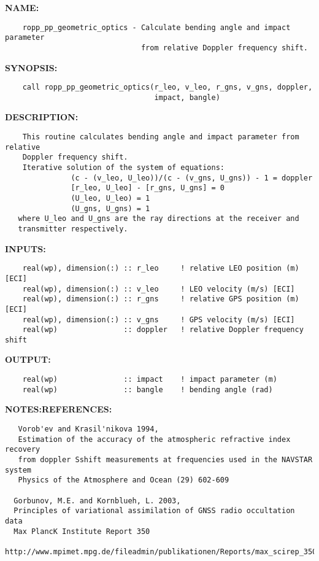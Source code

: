 \label{ch:robo19}
\label{ch:GeometricOptics_ropp_pp_geometric_optics}
\textbf{NAME:}\hspace{0.08in}\begin{Verbatim}
    ropp_pp_geometric_optics - Calculate bending angle and impact parameter 
                               from relative Doppler frequency shift.
\end{Verbatim}
\textbf{SYNOPSIS:}\hspace{0.08in}\begin{Verbatim}
    call ropp_pp_geometric_optics(r_leo, v_leo, r_gns, v_gns, doppler,
                                  impact, bangle)
\end{Verbatim}
\textbf{DESCRIPTION:}\hspace{0.08in}\begin{Verbatim}
    This routine calculates bending angle and impact parameter from relative
    Doppler frequency shift.
    Iterative solution of the system of equations:
               (c - (v_leo, U_leo))/(c - (v_gns, U_gns)) - 1 = doppler
               [r_leo, U_leo] - [r_gns, U_gns] = 0
               (U_leo, U_leo) = 1
               (U_gns, U_gns) = 1
   where U_leo and U_gns are the ray directions at the receiver and 
   transmitter respectively.
\end{Verbatim}
\textbf{INPUTS:}\hspace{0.08in}\begin{Verbatim}
    real(wp), dimension(:) :: r_leo     ! relative LEO position (m) [ECI]
    real(wp), dimension(:) :: v_leo     ! LEO velocity (m/s) [ECI]  
    real(wp), dimension(:) :: r_gns     ! relative GPS position (m) [ECI]
    real(wp), dimension(:) :: v_gns     ! GPS velocity (m/s) [ECI]  
    real(wp)               :: doppler   ! relative Doppler frequency shift
\end{Verbatim}
\textbf{OUTPUT:}\hspace{0.08in}\begin{Verbatim}
    real(wp)               :: impact    ! impact parameter (m)
    real(wp)               :: bangle    ! bending angle (rad)
\end{Verbatim}
\textbf{NOTES:}\hspace{0.08in}\textbf{REFERENCES:}\hspace{0.08in}\begin{Verbatim}
   Vorob'ev and Krasil'nikova 1994, 
   Estimation of the accuracy of the atmospheric refractive index recovery
   from doppler Sshift measurements at frequencies used in the NAVSTAR system
   Physics of the Atmosphere and Ocean (29) 602-609

  Gorbunov, M.E. and Kornblueh, L. 2003,
  Principles of variational assimilation of GNSS radio occultation data
  Max PlancK Institute Report 350 
  http://www.mpimet.mpg.de/fileadmin/publikationen/Reports/max_scirep_350.pdf
\end{Verbatim}
